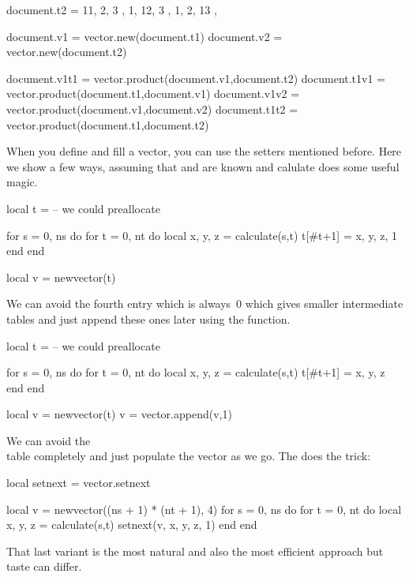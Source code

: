 document.t2 = {
    { 11, 2, 3 },
    { 1, 12, 3 },
    { 1, 2, 13 },
}

document.v1 = vector.new(document.t1)
document.v2 = vector.new(document.t2)

document.v1t1 = vector.product(document.v1,document.t2)
document.t1v1 = vector.product(document.t1,document.v1)
document.v1v2 = vector.product(document.v1,document.v2)
document.t1t2 = vector.product(document.t1,document.t2)
\stopluacode
\stopbuffer

\typebuffer[option=TEX] \getbuffer

\startlinecorrection
{} {}
    {} {}
    {} {}
    {} {}
\stopcombination
\stoplinecorrection

When you define and fill a vector, you can use the setters mentioned before. Here
we show a few ways, assuming that  and  are known and \type
{calulate} does some useful magic.

\starttyping[option=LUA]
local t = { }  -- we could preallocate

for s = 0, ns do
    for t = 0, nt do
        local x, y, z = calculate(s,t)
        t[#t+1] = { x, y, z, 1 }
   end
end

local v = newvector(t)
\stoptyping

We can avoid the fourth entry which is always~0 which gives smaller
intermediate tables and just append these ones later using
the  function.

\starttyping[option=LUA]
local t = { }  -- we could preallocate

for s = 0, ns do
    for t = 0, nt do
        local x, y, z = calculate(s,t)
        t[#t+1] = { x, y, z }
   end
end

local v = newvector(t)
v = vector.append(v,1)
\stoptyping

We can avoid the \LUA\\ table completely and just populate the
vector as we go. The  does the trick:

\starttyping[option=LUA]
local setnext = vector.setnext

local v = newvector((ns + 1) * (nt + 1), 4)
for s = 0, ns do
    for t = 0, nt do
        local x, y, z = calculate(s,t)
        setnext(v, x, y, z, 1)
   end
end
\stoptyping

That last variant is the most natural and also the most efficient approach but
taste can differ.

\stopsubsection

\stopsection

\stopdocument

%
